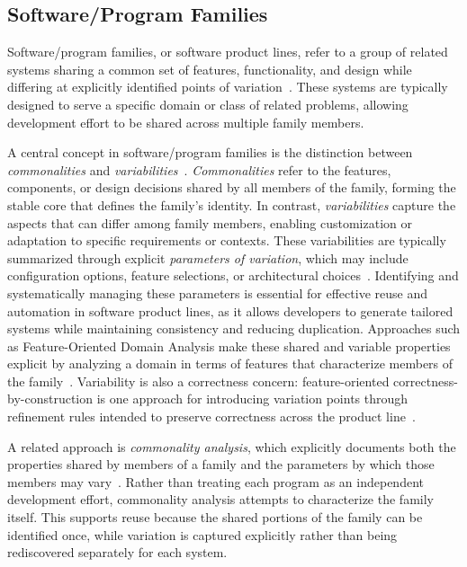 \subsection{Software/Program Families}

Software/program families, or software product lines, refer to a group of 
related systems sharing a common set of features, functionality, and 
design while differing at explicitly identified points of 
variation~\citep{Pohl2005,Kang1990}. These systems are typically designed to
serve a specific domain or class of related problems, allowing development 
effort to be shared across multiple family members.

A central concept in software/program families is the distinction between 
\emph{commonalities} and \emph{variabilities}~\citep{Bosch2000,Pohl2005}.
\emph{Commonalities} refer to the features, components, or design decisions 
shared by all members of the family, forming the stable core that defines the 
family's identity. In contrast, \emph{variabilities} capture the aspects that 
can differ among family members, enabling customization or adaptation to 
specific requirements or contexts. These variabilities are typically summarized 
through explicit \emph{parameters of variation}, which may include 
configuration options, feature selections, or architectural
choices~\citep{Weiss1998}.
Identifying and systematically managing these parameters is essential for 
effective reuse and automation in software product lines, as it allows 
developers to generate tailored systems while maintaining consistency and 
reducing duplication. Approaches such as Feature-Oriented Domain Analysis make 
these shared and variable properties explicit by analyzing a domain in terms of 
features that characterize members of the family~\citep{Kang1990}.
Variability is also a correctness concern: feature-oriented
correctness-by-construction is one approach for introducing variation points
through refinement rules intended to preserve correctness across the product
line~\citep{bordis2020}.

A related approach is \emph{commonality analysis}, which explicitly
documents both the properties shared by members of a family and the
parameters by which those members may vary~\citep{Weiss1998}. Rather than
treating each program as an independent development effort, commonality
analysis attempts to characterize the family itself. This supports reuse
because the shared portions of the family can be identified once, while
variation is captured explicitly rather than being rediscovered separately
for each system.

